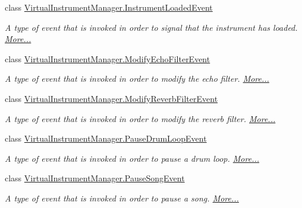 \begin{DoxyCompactItemize}
class \hyperlink{group___v_i_m_event_types_class_virtual_instrument_manager_1_1_instrument_loaded_event}{Virtual\+Instrument\+Manager.\+Instrument\+Loaded\+Event}
\begin{DoxyCompactList}\small\item\em A type of event that is invoked in order to signal that the instrument has loaded.  \hyperlink{group___v_i_m_event_types_class_virtual_instrument_manager_1_1_instrument_loaded_event}{More...}\end{DoxyCompactList}\item 
class \hyperlink{group___v_i_m_event_types_class_virtual_instrument_manager_1_1_modify_echo_filter_event}{Virtual\+Instrument\+Manager.\+Modify\+Echo\+Filter\+Event}
\begin{DoxyCompactList}\small\item\em A type of event that is invoked in order to modify the echo filter.  \hyperlink{group___v_i_m_event_types_class_virtual_instrument_manager_1_1_modify_echo_filter_event}{More...}\end{DoxyCompactList}\item 
class \hyperlink{group___v_i_m_event_types_class_virtual_instrument_manager_1_1_modify_reverb_filter_event}{Virtual\+Instrument\+Manager.\+Modify\+Reverb\+Filter\+Event}
\begin{DoxyCompactList}\small\item\em A type of event that is invoked in order to modify the reverb filter.  \hyperlink{group___v_i_m_event_types_class_virtual_instrument_manager_1_1_modify_reverb_filter_event}{More...}\end{DoxyCompactList}\item 
class \hyperlink{group___v_i_m_event_types_class_virtual_instrument_manager_1_1_pause_drum_loop_event}{Virtual\+Instrument\+Manager.\+Pause\+Drum\+Loop\+Event}
\begin{DoxyCompactList}\small\item\em A type of event that is invoked in order to pause a drum loop.  \hyperlink{group___v_i_m_event_types_class_virtual_instrument_manager_1_1_pause_drum_loop_event}{More...}\end{DoxyCompactList}\item 
class \hyperlink{group___v_i_m_event_types_class_virtual_instrument_manager_1_1_pause_song_event}{Virtual\+Instrument\+Manager.\+Pause\+Song\+Event}
\begin{DoxyCompactList}\small\item\em A type of event that is invoked in order to pause a song.  \hyperlink{group___v_i_m_event_types_class_virtual_instrument_manager_1_1_pause_song_event}{More...}\end{DoxyCompactList}\item 

\end{DoxyCompactItemize}
